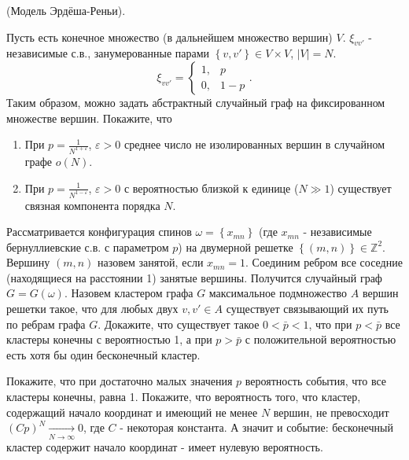 \begin{problem}

(Модель Эрдёша-Реньи).

 Пусть есть конечное множество (в дальнейшем множество вершин) $V$. $\xi _{vv'} $ - независимые с.в., занумерованные парами $\left\{v,v'\right\}\in V\times V$, $\vert V \vert = N$.
\[\xi _{vv'} =\left\{\begin{array}{cc} {1,} & {p} \\ {0,} & {1-p} \end{array}\right. .\] 
Таким образом, можно задать абстрактный случайный граф на фиксированном множестве вершин. Покажите, что 

\begin{enumerate}
\item  При $p=\frac{1}{N^{1+\varepsilon } } $, $\varepsilon >0$ среднее число не изолированных вершин в случайном графе $o\left(N\right)$.

\item  При $p=\frac{1}{N^{1-\varepsilon } } $, $\varepsilon >0$ с вероятностью близкой к единице ($N \gg 1$) существует связная компонента порядка $N$.
\end{enumerate}



\end{problem}

\begin{problem} 
Рассматривается конфигурация спинов $\omega =\left\{x_{mn} \right\}$ (где $x_{mn} $ - независимые бернуллиевские с.в. с параметром $p$) на двумерной решетке $\left\{(m,n)\right\}\in {\mathbb Z}^{2} $. Вершину $(m,n)$ назовем занятой, если $x_{mn} =1$. Соединим ребром все соседние (находящиеся на расстоянии 1) занятые вершины. Получится случайный граф $G=G\left(\omega \right)$. Назовем кластером графа $G$ максимальное подмножество $A$ вершин решетки такое, что для любых двух $v,v'\in A$ существует связывающий их путь по ребрам графа $G$. Докажите, что существует такое $0<\bar{p}<1$, что при $p<\bar{p}$ все кластеры конечны с вероятностью 1, а при $p>\bar{p}$ с положительной вероятностью есть хотя бы один бесконечный кластер.


\begin{ordre}
Покажите, что при достаточно малых значения $p$ вероятность события, что все кластеры конечны, равна 1. Покажите, что вероятность того, что кластер, содержащий начало координат и имеющий не менее $N$ вершин, не превосходит $\left(Cp\right)^{N} \mathop{\to }\limits_{N\to \infty } 0$, где $C$ - некоторая константа. А значит и событие: бесконечный кластер содержит начало координат - имеет нулевую вероятность.
\end{ordre}

\end{problem}


